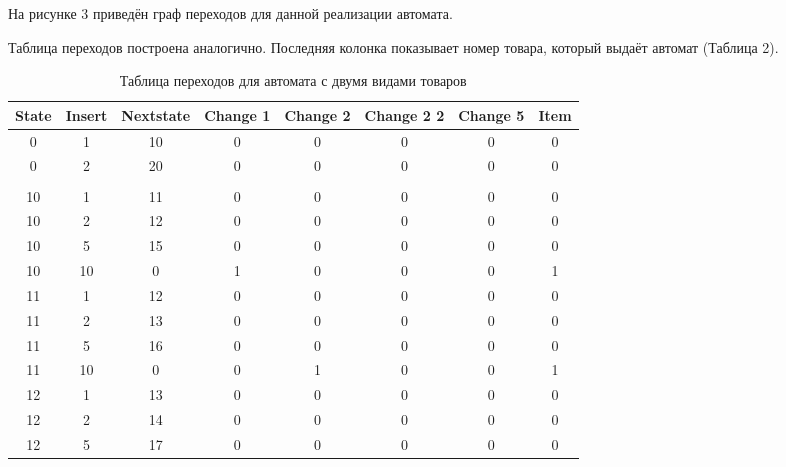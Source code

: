 На рисунке 3 приведён граф переходов для данной реализации автомата.

\FloatBarrier

Таблица переходов построена аналогично. Последняя колонка показывает номер товара, который выдаёт автомат (Таблица 2).


\begingroup
\renewcommand\arraystretch{0.7}
\begin{longtable}[c]{|c|c|c|c|c|c|c|c|}
\caption{Таблица переходов для автомата с двумя видами товаров}
\\
\hline
State & Insert & Nextstate & Change 1 & Change 2 & Change 2 2 & Change 5 & Item \\ \hline
\endfirsthead
%
\endhead
%
0     & 1      & 10        & 0        & 0        & 0          & 0        & 0    \\ \hline
0     & 2      & 20        & 0        & 0        & 0          & 0        & 0    \\ \hline
        &        &           &          &          &            &          &      \\ \hline
10    & 1      & 11        & 0        & 0        & 0          & 0        & 0    \\ \hline
10    & 2      & 12        & 0        & 0        & 0          & 0        & 0    \\ \hline
10    & 5      & 15        & 0        & 0        & 0          & 0        & 0    \\ \hline
10    & 10     & 0         & 1        & 0        & 0          & 0        & 1    \\ \hline
11    & 1      & 12        & 0        & 0        & 0          & 0        & 0    \\ \hline
11    & 2      & 13        & 0        & 0        & 0          & 0        & 0    \\ \hline
11    & 5      & 16        & 0        & 0        & 0          & 0        & 0    \\ \hline
11    & 10     & 0         & 0        & 1        & 0          & 0        & 1    \\ \hline
12    & 1      & 13        & 0        & 0        & 0          & 0        & 0    \\ \hline
12    & 2      & 14        & 0        & 0        & 0          & 0        & 0    \\ \hline
12    & 5      & 17        & 0        & 0        & 0          & 0        & 0    \\ \hline

\end{longtable}
